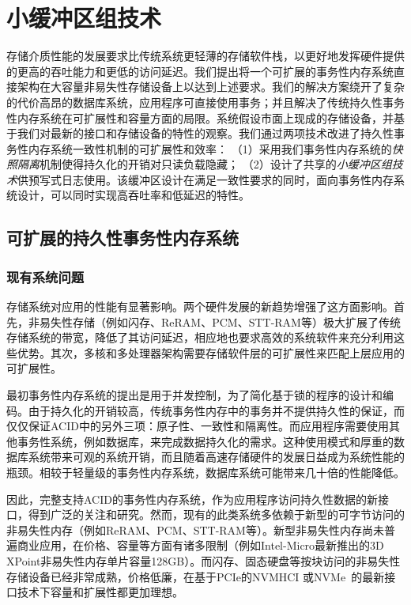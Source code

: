\chapter{小缓冲区组技术}
\label{chap:sba}

存储介质性能的发展要求比传统系统更轻薄的存储软件栈，以更好地发挥硬件提供的更高的吞吐能力和更低的访问延迟。我们提出将一个可扩展的事务性内存系统直接架构在大容量非易失性存储设备上以达到上述要求。我们的解决方案绕开了复杂的代价高昂的数据库系统，应用程序可直接使用事务；并且解决了传统持久性事务性内存系统在可扩展性和容量方面的局限。系统假设市面上现成的存储设备，并基于我们对最新的接口和存储设备的特性的观察。我们通过两项技术改进了持久性事务性内存系统一致性机制的可扩展性和效率：
（1）采用我们事务性内存系统的\emph{快照隔离}机制使得持久化的开销对只读负载隐藏；
（2）设计了共享的\emph{小缓冲区组技术}供预写式日志使用。该缓冲区设计在满足一致性要求的同时，面向事务性内存系统设计，可以同时实现高吞吐率和低延迟的特性。

\section{可扩展的持久性事务性内存系统}

\subsection{现有系统问题}

存储系统对应用的性能有显著影响。两个硬件发展的新趋势增强了这方面影响。首先，非易失性存储（例如闪存\cite{Chen:2009:UIC:1555349.1555371, 4804997}、ReRAM\cite{6327378, 7168603}、PCM\cite{Loke22062012,6176872,Raoux:2008:PRA,10.1109/MM.2010.24}、STT-RAM\cite{4443191,6557176}等）极大扩展了传统存储系统的带宽，降低了其访问延迟，相应地也要求高效的系统软件来充分利用这些优势。其次，多核和多处理器架构需要存储软件层的可扩展性来匹配上层应用的可扩展性\cite{Zheng:2014:FDF:2685048.2685085,Kimura:2015:FOE:2723372.2746480}。

最初事务性内存系统的提出是用于并发控制，为了简化基于锁的程序的设计和编码。由于持久化的开销较高，传统事务性内存中的事务并不提供持久性的保证，而仅仅保证ACID中的另外三项：原子性、一致性和隔离性。而应用程序需要使用其他事务性系统，例如数据库，来完成数据持久化的需求。这种使用模式和厚重的数据库系统带来可观的系统开销，而且随着高速存储硬件的发展日益成为系统性能的瓶颈。相较于轻量级的事务性内存系统，数据库系统可能带来几十倍的性能降低\cite{Volos:2011:MLP:1950365.1950379,
Coburn:2011:NMP:1950365.1950380}。

因此，完整支持ACID的事务性内存系统，作为应用程序访问持久性数据的新接口，得到广泛的关注和研究\cite{Volos:2011:MLP:1950365.1950379,
Coburn:2011:NMP:1950365.1950380, Zhao:2013:KCP:2540708.2540744, 6828760}。然而，现有的此类系统多依赖于新型的可字节访问的非易失性内存（例如ReRAM、PCM、STT-RAM等）。新型非易失性内存尚未普遍商业应用，在价格、容量等方面有诸多限制（例如Intel-Micro最新推出的3D XPoint非易失性内存单片容量128GB）。而闪存、固态硬盘等按块访问的非易失性存储设备已经非常成熟，价格低廉，在基于PCIe的NVMHCI 或NVMe~\cite{nvme}的最新接口技术下容量和扩展性都更加理想。

